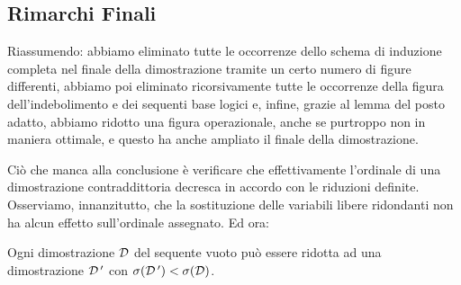 	\subsection{Rimarchi Finali}
		Riassumendo: abbiamo eliminato tutte le occorrenze dello schema di induzione completa nel finale della dimostrazione tramite un certo numero di figure differenti, abbiamo poi eliminato ricorsivamente tutte le occorrenze della figura dell'indebolimento e dei sequenti base logici e, infine, grazie al lemma del posto adatto, abbiamo ridotto una figura operazionale, anche se purtroppo non in maniera ottimale, e questo ha anche ampliato il finale della dimostrazione.
		
		Ciò che manca alla conclusione è verificare che effettivamente l'ordinale di una dimostrazione contraddittoria decresca in accordo con le riduzioni definite. Osserviamo, innanzitutto, che la sostituzione delle variabili libere ridondanti non ha alcun effetto sull'ordinale assegnato. Ed ora:
	\begin{teo}
		Ogni dimostrazione $\mathcal{D}$ del sequente vuoto può essere ridotta ad una dimostrazione $\mathcal{D\,'}$ con $\sigma(\mathcal{D\,'})<\sigma(\mathcal{D})$. 
	\end{teo}
